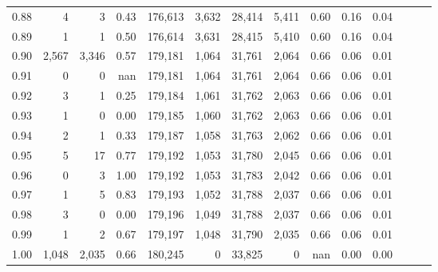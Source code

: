 \begin{tabular}{rrrrrrrrrrrrrr}
0.88 &       4 &      3 &  0.43 &  176,613 &    3,632 &  28,414 &   5,411 &  0.60 &  0.16 &      0.04 \\
0.89 &       1 &      1 &  0.50 &  176,614 &    3,631 &  28,415 &   5,410 &  0.60 &  0.16 &      0.04 \\
0.90 &   2,567 &  3,346 &  0.57 &  179,181 &    1,064 &  31,761 &   2,064 &  0.66 &  0.06 &      0.01 \\
0.91 &       0 &      0 &   nan &  179,181 &    1,064 &  31,761 &   2,064 &  0.66 &  0.06 &      0.01 \\
0.92 &       3 &      1 &  0.25 &  179,184 &    1,061 &  31,762 &   2,063 &  0.66 &  0.06 &      0.01 \\
0.93 &       1 &      0 &  0.00 &  179,185 &    1,060 &  31,762 &   2,063 &  0.66 &  0.06 &      0.01 \\
0.94 &       2 &      1 &  0.33 &  179,187 &    1,058 &  31,763 &   2,062 &  0.66 &  0.06 &      0.01 \\
0.95 &       5 &     17 &  0.77 &  179,192 &    1,053 &  31,780 &   2,045 &  0.66 &  0.06 &      0.01 \\
0.96 &       0 &      3 &  1.00 &  179,192 &    1,053 &  31,783 &   2,042 &  0.66 &  0.06 &      0.01 \\
0.97 &       1 &      5 &  0.83 &  179,193 &    1,052 &  31,788 &   2,037 &  0.66 &  0.06 &      0.01 \\
0.98 &       3 &      0 &  0.00 &  179,196 &    1,049 &  31,788 &   2,037 &  0.66 &  0.06 &      0.01 \\
0.99 &       1 &      2 &  0.67 &  179,197 &    1,048 &  31,790 &   2,035 &  0.66 &  0.06 &      0.01 \\
1.00 &   1,048 &  2,035 &  0.66 &  180,245 &        0 &  33,825 &       0 &   nan &  0.00 &      0.00 \\
\bottomrule
\end{tabular}

